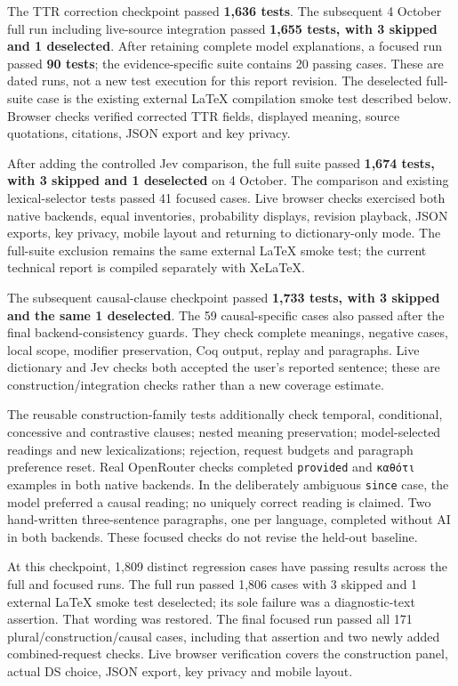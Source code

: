 \documentclass[11pt,a4paper]{article}
\begin{document}
The TTR correction checkpoint passed \textbf{1,636 tests}. The
subsequent 4 October full run including live-source integration passed
\textbf{1,655 tests, with 3 skipped and 1 deselected}. After retaining
complete model explanations, a focused run passed \textbf{90 tests}; the
evidence-specific suite contains 20 passing cases. These are dated runs,
not a new test execution for this report revision. The deselected
full-suite case is the existing external LaTeX compilation smoke test
described below. Browser checks verified corrected TTR fields, displayed
meaning, source quotations, citations, JSON export and key privacy.

After adding the controlled Jev comparison, the full suite passed
\textbf{1,674 tests, with 3 skipped and 1 deselected} on 4 October. The
comparison and existing lexical-selector tests passed 41 focused cases.
Live browser checks exercised both native backends, equal inventories,
probability displays, revision playback, JSON exports, key privacy,
mobile layout and returning to dictionary-only mode. The full-suite
exclusion remains the same external LaTeX smoke test; the current
technical report is compiled separately with XeLaTeX.

The subsequent causal-clause checkpoint passed \textbf{1,733 tests, with
3 skipped and the same 1 deselected}. The 59 causal-specific cases also
passed after the final backend-consistency guards. They check complete
meanings, negative cases, local scope, modifier preservation, Coq
output, replay and paragraphs. Live dictionary and Jev checks both
accepted the user's reported sentence; these are
construction/integration checks rather than a new coverage estimate.

The reusable construction-family tests additionally check temporal,
conditional, concessive and contrastive clauses; nested meaning
preservation; model-selected readings and new lexicalizations;
rejection, request budgets and paragraph preference reset. Real
OpenRouter checks completed \texttt{provided} and \texttt{καθότι}
examples in both native backends. In the deliberately ambiguous
\texttt{since} case, the model preferred a causal reading; no uniquely
correct reading is claimed. Two hand-written three-sentence paragraphs,
one per language, completed without AI in both backends. These focused
checks do not revise the held-out baseline.

At this checkpoint, 1,809 distinct regression cases have passing results
across the full and focused runs. The full run passed 1,806 cases with 3
skipped and 1 external LaTeX smoke test deselected; its sole failure was
a diagnostic-text assertion. That wording was restored. The final
focused run passed all 171 plural/construction/causal cases, including
that assertion and two newly added combined-request checks. Live browser
verification covers the construction panel, actual DS choice, JSON
export, key privacy and mobile layout.
\end{document}
